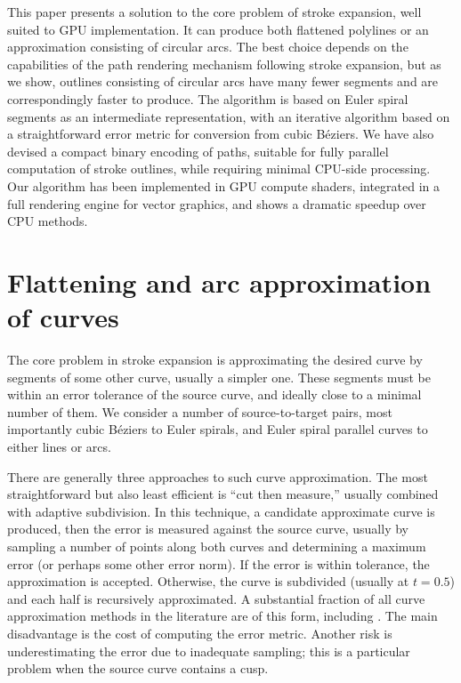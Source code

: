 \documentclass[sigconf, nonacm]{acmart}
\begin{document}
This paper presents a solution to the core problem of stroke expansion, well suited to GPU implementation. It can produce both flattened polylines or an approximation consisting of circular arcs. The best choice depends on the capabilities of the path rendering mechanism following stroke expansion, but as we show, outlines consisting of circular arcs have many fewer segments and are correspondingly faster to produce. The algorithm is based on Euler spiral segments as an intermediate representation, with an iterative algorithm based on a straightforward error metric for conversion from cubic Béziers. We have also devised a compact binary encoding of paths, suitable for fully parallel computation of stroke outlines, while requiring minimal CPU-side processing. Our algorithm has been implemented in GPU compute shaders, integrated in a full rendering engine for vector graphics, and shows a dramatic speedup over CPU methods.

\section{Flattening and arc approximation of curves}


The core problem in stroke expansion is approximating the desired curve by segments of some other curve, usually a simpler one. These segments must be within an error tolerance of the source curve, and ideally close to a minimal number of them. We consider a number of source-to-target pairs, most importantly cubic Béziers to Euler spirals, and Euler spiral parallel curves to either lines or arcs.

There are generally three approaches to such curve approximation. The most straightforward but also least efficient is ``cut then measure,'' usually combined with adaptive subdivision. In this technique, a candidate approximate curve is produced, then the error is measured against the source curve, usually by sampling a number of points along both curves and determining a maximum error (or perhaps some other error norm). If the error is within tolerance, the approximation is accepted. Otherwise, the curve is subdivided (usually at $t = 0.5$) and each half is recursively approximated. A substantial fraction of all curve approximation methods in the literature are of this form, including \citet{Nehab2020}. The main disadvantage is the cost of computing the error metric. Another risk is underestimating the error due to inadequate sampling; this is a particular problem when the source curve contains a cusp.
\end{document}
